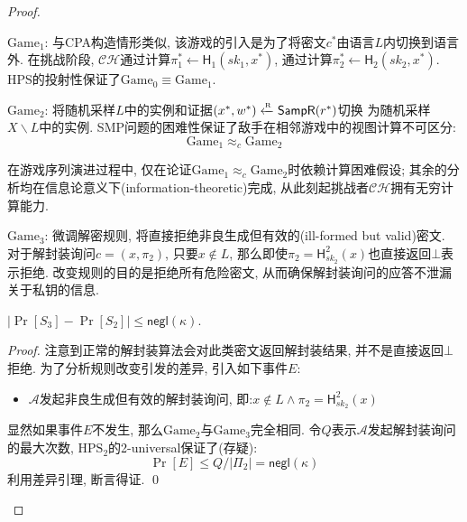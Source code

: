 \begin{proof}
\begin{trivlist}
\item $\text{Game}_1$: 与CPA构造情形类似, 该游戏的引入是为了将密文$c^*$由语言$L$内切换到语言外. 
    在挑战阶段, $\mathcal{CH}$通过计算$\pi_1^* \leftarrow \mathsf{H}_1(sk_1, x^*)$, 
    通过计算$\pi_2^* \leftarrow \mathsf{H}_2(sk_2, x^*)$. 
    HPS的投射性保证了$\text{Game}_0 \equiv \text{Game}_1$. 

\item $\text{Game}_2$: 将随机采样$L$中的实例和证据$(x^*, w^*) \xleftarrow{\textup{\tiny R}} \mathsf{SampR}(r^*)$切换
    为随机采样$X \backslash L$中的实例.  
    SMP问题的困难性保证了敌手在相邻游戏中的视图计算不可区分: 
    \begin{equation*}
        \text{Game}_1 \approx_c \text{Game}_2
    \end{equation*}

在游戏序列演进过程中, 仅在论证$\text{Game}_1 \approx_c \text{Game}_2$时依赖计算困难假设; 
其余的分析均在信息论意义下(information-theoretic)完成, 从此刻起挑战者$\mathcal{CH}$拥有无穷计算能力. 
 
\item $\text{Game}_3$: 微调解密规则, 将直接拒绝非良生成但有效的(ill-formed but valid)密文.  
    对于解封装询问$c = (x, \pi_2)$, 只要$x \notin L$, 那么即使$\pi_2 = \mathsf{H}_{sk_2}^2(x)$也直接返回$\bot$表示拒绝. 
    改变规则的目的是拒绝所有危险密文, 从而确保解封装询问的应答不泄漏关于私钥的信息. 

\begin{claim}
    $|\Pr[S_3] - \Pr[S_2]| \leq \mathsf{negl}(\kappa)$. 
\end{claim}
\begin{proof}
注意到正常的解封装算法会对此类密文返回解封装结果, 并不是直接返回$\bot$拒绝. 为了分析规则改变引发的差异, 引入如下事件$E$: 
\begin{itemize}
    \item $\mathcal{A}$发起非良生成但有效的解封装询问, 即:$x \notin L \wedge \pi_2 = \mathsf{H}_{sk_2}^2(x)$
\end{itemize} 
显然如果事件$E$不发生, 那么$\text{Game}_2$与$\text{Game}_3$完全相同. 
令$Q$表示$\mathcal{A}$发起解封装询问的最大次数, $\text{HPS}_2$的2-universal保证了(存疑): 
\begin{equation*}
    \Pr[E] \leq Q/|\Pi_2| = \mathsf{negl}(\kappa)
\end{equation*}
利用差异引理, 断言得证. \qed  
\end{proof}


\end{trivlist}
\end{proof}
